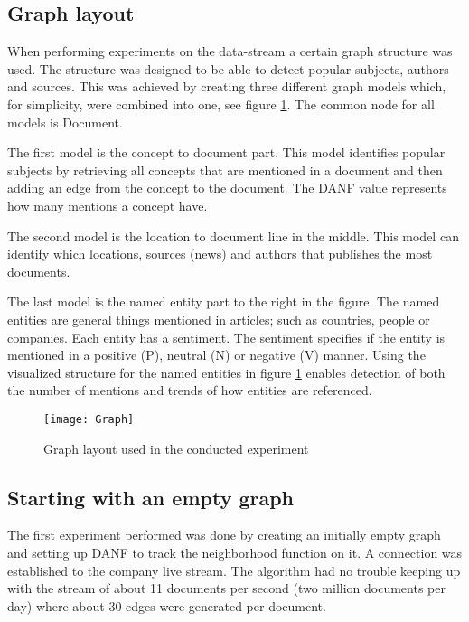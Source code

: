 \subsection{Graph layout}

When performing experiments on the data-stream a certain graph structure was used. The structure was designed to be able to detect popular subjects, authors and sources. This was achieved by creating three different graph models which, for simplicity, were combined into one, see figure \ref{fig:experiment-graph}. The common node for all models is Document. 

The first model is the concept to document part. This model identifies popular subjects by retrieving all concepts that are mentioned in a document and then adding an edge from the concept to the document. The DANF value represents how many mentions a concept have. 

The second model is the location to document line in the middle. This model can identify which locations, sources (news) and authors that publishes the most documents.

The last model is the named entity part to the right in the figure. The named entities are general things mentioned in articles; such as countries, people or companies. Each entity has a sentiment. The sentiment specifies if the entity is mentioned in a positive (P), neutral (N) or negative (V) manner. Using the visualized structure for the named entities in figure \ref{fig:experiment-graph} enables detection of both the number of mentions and trends of how entities are referenced.

\begin{figure}[h]
\centering
\texttt{[image: Graph]}    
\captionsetup{justification=centering}
\caption {Graph layout used in the conducted experiment}
\label{fig:experiment-graph}
\end{figure}


\subsection{Starting with an empty graph}

The first experiment performed was done by creating an initially empty graph and setting up DANF to track the neighborhood function on it. A connection was established to the company live stream. The algorithm had no trouble keeping up with the stream of about 11 documents per second (two million documents per day) where about 30 edges were generated per document. 

